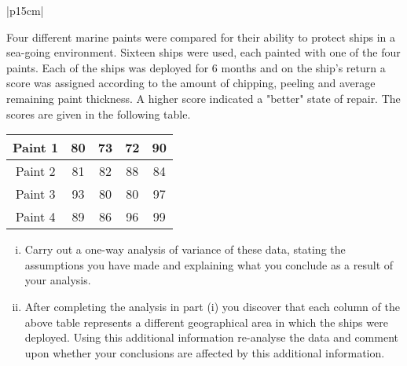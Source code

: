 \documentclass[a4paper,12pt]{article}
\begin{document}
\begin{table}[ht!]
     

\centering
     

\begin{tabular}{|p{15cm}|}
     

\hline 
\large


Four different marine paints were compared for their ability to protect ships in a sea-going environment.  Sixteen ships were used, each painted with one of the four paints.  Each of the ships was deployed for 6 months and on the ship's return a score was assigned according to the amount of chipping, peeling and average remaining paint thickness.  A higher score indicated a "better" state of repair.  The scores are given in the following table. 
 

\begin{center}
\begin{tabular}{|c||c|c|c|c|} \hline
Paint 1 & 80 & 73 & 72&  90 \\ \hline 
Paint 2 & 81 & 82 & 88&  84  \\ \hline
Paint 3 & 93 & 80 & 80&  97 \\ \hline
Paint 4 & 89 & 86 & 96&  99 \\ \hline
\end{tabular}
\end{center}
 
\begin{enumerate}[(i)]
\item Carry out a one-way analysis of variance of these data, stating the assumptions you have made and explaining what you conclude as a result of your analysis. %
\item  
After completing the analysis in part (i) you discover that each column of the above table represents a different geographical area in which the ships were deployed.  Using this additional information re-analyse the data and comment upon whether your conclusions are affected by this additional information. %
\end{enumerate} 
\\ \hline


\end{tabular}
    

\end{table}

\end{document}

